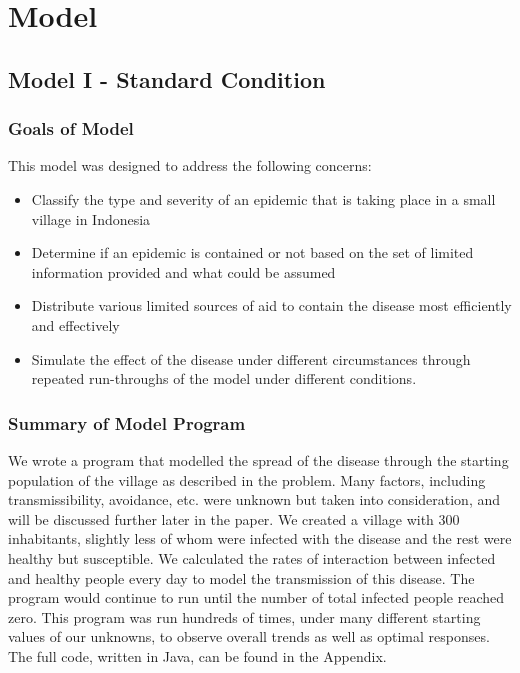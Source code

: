 \documentclass[11pt]{article}
\begin{document}
\newpage
\section{Model}

\subsection{Model I - Standard Condition}

\subsubsection{Goals of Model}

This model was designed to address the following concerns:
\begin{itemize}
	\item Classify the type and severity of an epidemic that is taking place in a small village in Indonesia
	\item Determine if an epidemic is contained or not based on the set of limited information provided and what could be assumed
	\item Distribute various limited sources of aid to contain the disease most efficiently and effectively
	\item Simulate the effect of the disease under different circumstances through repeated run-throughs of the model under different conditions.
\end{itemize}

\subsubsection{Summary of Model Program}

We wrote a program that modelled the spread of the disease through the starting population of the village as described in the problem. Many factors, including transmissibility, avoidance, etc. were unknown but taken into consideration, and will be discussed further later in the paper. We created a village with 300 inhabitants, slightly less of whom were infected with the disease and the rest were healthy but susceptible. We calculated the rates of interaction between infected and healthy people every day to model the transmission of this disease. The program would continue to run until the number of total infected people reached zero. This program was run hundreds of times, under many different starting values of our unknowns, to observe overall trends as well as optimal responses. The full code, written in Java, can be found in the Appendix.
\end{document}
